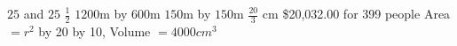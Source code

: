 \begin{Answer}[ref={exOptimisation}]
\Question %
$25$ and $25$
\Question %
$\frac{1}{2}$ 
\Question %
$1200 \mbox{m}$ by $600 \mbox{m}$
\Question %
$150 \mbox{m}$ by $150 \mbox{m}$ 
\Question %
$\frac{20}{3}$ cm
\Question %
\$20,032.00 for 399 people
\Question %
 Area $ =r^{2}$ 
 by 20 by 10, Volume $ =4000 cm^{3}$ 	
\end{Answer}%
